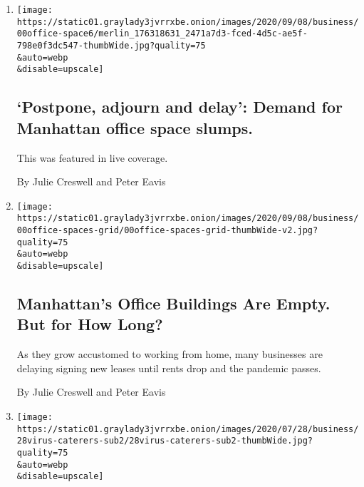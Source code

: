 \begin{enumerate}
\def\labelenumi{\arabic{enumi}.}
\item
  \href{/live/2020/09/09/business/stock-market-today-coronavirus/postpone-adjourn-and-delay-demand-for-manhattan-office-space-slumps}{}

  \texttt{[image: https://static01.graylady3jvrrxbe.onion/images/2020/09/08/business/00office-space6/merlin\_176318631\_2471a7d3-fced-4d5c-ae5f-798e0f3dc547-thumbWide.jpg?quality=75\\\&auto=webp\\\&disable=upscale]}

  \hypertarget{postpone-adjourn-and-delay-demand-for-manhattan-office-space-slumps}{%
  \subsection{`Postpone, adjourn and delay': Demand for Manhattan office
  space
  slumps.}\label{postpone-adjourn-and-delay-demand-for-manhattan-office-space-slumps}}

  This was featured in live coverage.

  By Julie Creswell and Peter Eavis
\item
  \href{/2020/09/08/business/economy/new-york-office-space-coronavirus.html}{}

  \texttt{[image: https://static01.graylady3jvrrxbe.onion/images/2020/09/08/business/00office-spaces-grid/00office-spaces-grid-thumbWide-v2.jpg?quality=75\\\&auto=webp\\\&disable=upscale]}

  \hypertarget{manhattans-office-buildings-are-empty-but-for-how-long}{%
  \subsection{Manhattan's Office Buildings Are Empty. But for How
  Long?}\label{manhattans-office-buildings-are-empty-but-for-how-long}}

  As they grow accustomed to working from home, many businesses are
  delaying signing new leases until rents drop and the pandemic passes.

  By Julie Creswell and Peter Eavis
\item
  \href{/2020/08/04/business/some-caterers-are-finding-creative-ways-to-keep-their-businesses-afloat.html}{}

  \texttt{[image: https://static01.graylady3jvrrxbe.onion/images/2020/07/28/business/28virus-caterers-sub2/28virus-caterers-sub2-thumbWide.jpg?quality=75\\\&auto=webp\\\&disable=upscale]}

  \hypertarget{some-caterers-are-finding-creative-ways-to-keep-their-businesses-afloat}{%
}
\end{enumerate}
